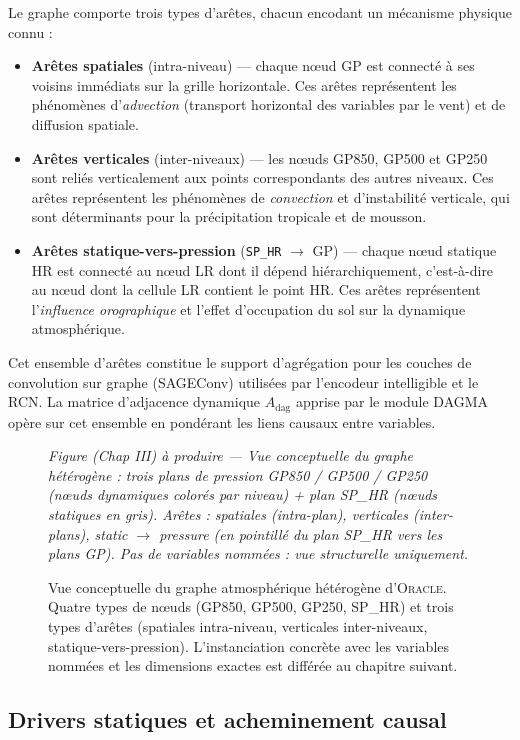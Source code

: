 \documentclass[14pt,a4paper,openany]{extreport}
\theoremstyle{definition}
\newcommand{\Oracle}{\textsc{Oracle}}
\newcommand{\Adag}{\ensuremath{A_{\mathrm{dag}}}}
\newcommand{\figplaceholder}[2][0.9\linewidth]{%
  \begin{tcolorbox}[width=#1,height=5cm,valign=center,colback=gray!8,colframe=gray!45,arc=2pt,boxrule=0.5pt]
    \centering\small\textit{#2}
  \end{tcolorbox}%
}
\begin{document}
Le graphe comporte trois types d'arêtes, chacun encodant un mécanisme physique connu :
\begin{itemize}
  \item \textbf{Arêtes spatiales} (intra-niveau) --- chaque nœud GP est connecté à ses voisins immédiats sur la grille horizontale. Ces arêtes représentent les phénomènes d'\emph{advection} (transport horizontal des variables par le vent) et de diffusion spatiale.
  \item \textbf{Arêtes verticales} (inter-niveaux) --- les nœuds GP850, GP500 et GP250 sont reliés verticalement aux points correspondants des autres niveaux. Ces arêtes représentent les phénomènes de \emph{convection} et d'instabilité verticale, qui sont déterminants pour la précipitation tropicale et de mousson.
  \item \textbf{Arêtes statique-vers-pression} (\texttt{SP\_HR} $\to$ GP) --- chaque nœud statique HR est connecté au nœud LR dont il dépend hiérarchiquement, c'est-à-dire au nœud dont la cellule LR contient le point HR. Ces arêtes représentent l'\emph{influence orographique} et l'effet d'occupation du sol sur la dynamique atmosphérique.
\end{itemize}

Cet ensemble d'arêtes constitue le support d'agrégation pour les couches de convolution sur graphe (SAGEConv) utilisées par l'encodeur intelligible et le RCN. La matrice d'adjacence dynamique $\Adag$ apprise par le module DAGMA opère sur cet ensemble en pondérant les liens causaux entre variables.

\begin{figure}[ht]
  \centering
  \figplaceholder[0.85\linewidth]{Figure (Chap III) à produire --- Vue conceptuelle du graphe hétérogène : trois plans de pression GP850 / GP500 / GP250 (nœuds dynamiques colorés par niveau) + plan SP\_HR (nœuds statiques en gris). Arêtes : spatiales (intra-plan), verticales (inter-plans), static $\to$ pressure (en pointillé du plan SP\_HR vers les plans GP). Pas de variables nommées : vue structurelle uniquement.}
  \caption{Vue conceptuelle du graphe atmosphérique hétérogène d'\Oracle{}. Quatre types de nœuds (GP850, GP500, GP250, SP\_HR) et trois types d'arêtes (spatiales intra-niveau, verticales inter-niveaux, statique-vers-pression). L'instanciation concrète avec les variables nommées et les dimensions exactes est différée au chapitre suivant.}
  \label{fig:graphe-conceptuel}
\end{figure}

\subsection{Drivers statiques et acheminement causal}
\label{ssec:oracle-statics}
\end{document}
